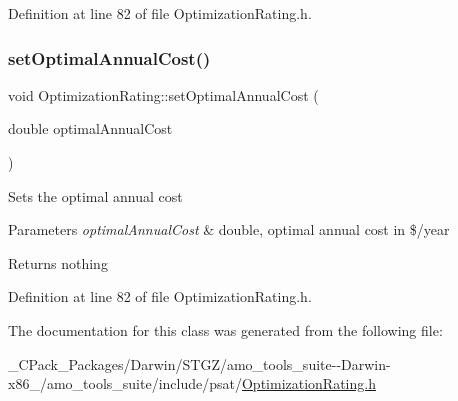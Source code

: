 Definition at line 82 of file Optimization\+Rating.\+h.

\mbox{\label{class_optimization_rating_a4651985a899b2bff18e8356a42c2d37f}} 
\subsubsection{\texorpdfstring{set\+Optimal\+Annual\+Cost()}{setOptimalAnnualCost()}\hspace{0.1cm}{\footnotesize\ttfamily [3/3]}}
{\footnotesize\ttfamily void Optimization\+Rating\+::set\+Optimal\+Annual\+Cost (\begin{DoxyParamCaption}\item[{double}]{optimal\+Annual\+Cost }\end{DoxyParamCaption})\hspace{0.3cm}{\ttfamily [inline]}}

Sets the optimal annual cost


\begin{DoxyParams}{Parameters}
{\em optimal\+Annual\+Cost} & double, optimal annual cost in \$/year\\
\hline
\end{DoxyParams}
\begin{DoxyReturn}{Returns}
nothing 
\end{DoxyReturn}


Definition at line 82 of file Optimization\+Rating.\+h.



The documentation for this class was generated from the following file\+:\begin{DoxyCompactItemize}
\item 
\+\_\+\+C\+Pack\+\_\+\+Packages/\+Darwin/\+S\+T\+G\+Z/amo\+\_\+tools\+\_\+suite-\/-\/\+Darwin-\/x86\+\_/amo\+\_\+tools\+\_\+suite/include/psat/\hyperlink{___c_pack___packages_2_darwin_2_s_t_g_z_2amo__tools__suite--_darwin-x86__64_2amo__tools__suite_22eee3c5eab8a16ff89910a69ef7793c2}{Optimization\+Rating.\+h}\end{DoxyCompactItemize}
